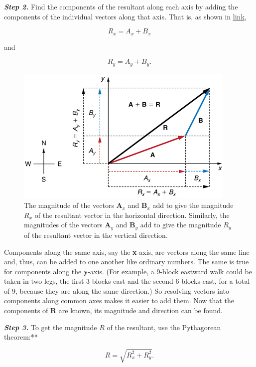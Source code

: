 \documentclass[
]{book}
\begin{document}
\emph{\textbf{Step 2.} }Find the components of the resultant along each axis by
adding the components of the individual vectors along that axis\emph{.} That
is, as shown in
\protect\hyperlink{import-auto-id1165298866862}{link},

\leavevmode\hypertarget{eip-284}{}%
\[{R_{x} = {A_{x} + B_{x}}}{}\]

and

\leavevmode\hypertarget{eip-92}{}%
\[{R_{y} = {A_{y} + B_{y}}}\text{.}{}\]

\begin{figure}
\hypertarget{import-auto-id1165298866862}{%
\centering
\includegraphics{images/Figure_03_03_07a.jpg}
\caption{The magnitude of the vectors \(\mathbf{A}_{x}{}\) and \(\mathbf{B}_{x}{}\)
add to give the magnitude \(R_{x}{}\) of the resultant vector in the
horizontal direction. Similarly, the magnitudes of the vectors
\(\mathbf{A}_{y}{}\) and \(\mathbf{B}_{y}{}\) add to give the magnitude
\(R_{y}{}\) of the resultant vector in the vertical
direction.}\label{import-auto-id1165298866862}
}
\end{figure}

Components along the same axis, say the \textbf{x}-axis, are vectors along
the same line and, thus, can be added to one another like ordinary
numbers. The same is true for components along the \textbf{y}-axis. (For
example, a 9-block eastward walk could be taken in two legs, the first 3
blocks east and the second 6 blocks east, for a total of 9, because they
are along the same direction.) So resolving vectors into components
along common axes makes it easier to add them. Now that the components
of \(\mathbf{R}{}\) are known, its magnitude and direction can be found.

\emph{\textbf{Step 3.} }To get the magnitude \(R\) of the resultant, use the
Pythagorean theorem:**

\leavevmode\hypertarget{eip-960}{}%
\[{R = \sqrt{R_{x}^{2} + R_{y}^{2}}}\text{.}{}\]
\end{document}
